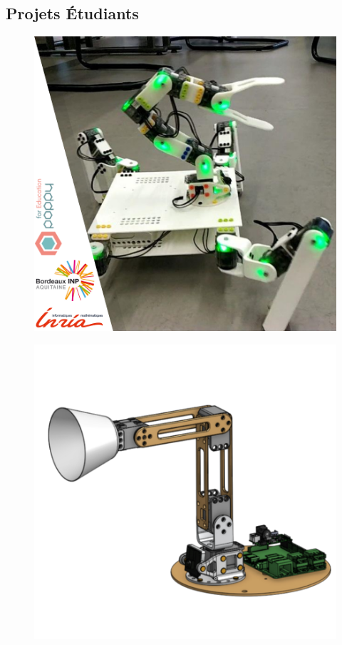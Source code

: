     \subsection{Projets Étudiants}
        \begin{figure}[!h]
        \begin{minipage}{0.29\linewidth}
          \centering
          \includegraphics[width=\linewidth]{Figures/poppy-diplo}
          \label{fig:Poppy-Diplo}
        \end{minipage}
        \hfill
        \begin{minipage}{0.29\linewidth}
          \centering
          \includegraphics[width=\linewidth]{Figures/Poppy-Starter.png}

\end{minipage}
\end{figure}
